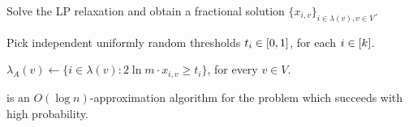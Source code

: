 \begin{algorithm}[H]
\caption{$O(\log n)$-approximation algorithm for the \coverage problem} \label{alg:1}%

Solve the LP relaxation and obtain a fractional solution $\{x_{i, v}\}_{i\in\lambda(v), v\in V}$.

Pick independent uniformly random thresholds $t_i \in \mathopen{}\left[ 0, 1 \right]$, for each $i \in \mathopen{}\left[ k \right]$.

$\lambda_A(v) \gets \{i \in \lambda(v) \colon 2\ln m\cdot x_{i, v} \geq t_i\}$, for every $v \in V$.

\end{algorithm}

\begin{theorem}
 is an $O(\log n)$-approximation algorithm for the \coverage problem which succeeds with high probability.
\end{theorem}
